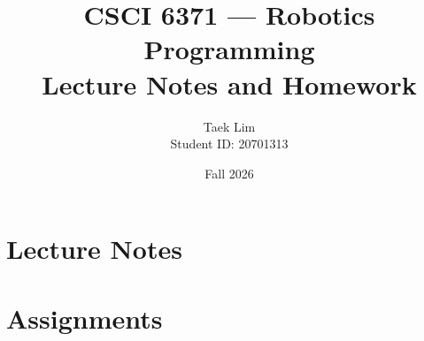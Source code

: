 \documentclass[11pt]{report}
\title{CSCI 6371 --- Robotics Programming\\Lecture Notes and Homework}
\author{Taek Lim \\ Student ID: 20701313}
\date{Fall 2026}
\begin{document}
\maketitle
\tableofcontents

\part{Lecture Notes}
\korfloatnames




\part{Assignments}
\engfloatnames




\end{document}
